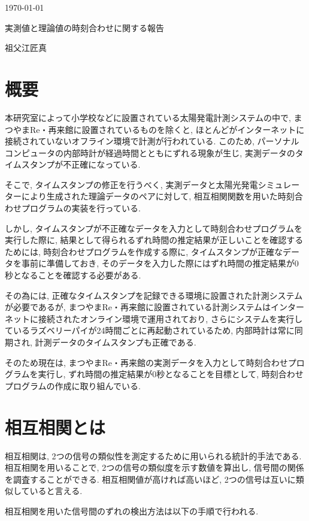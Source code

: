 \documentclass[a4j,12pt,]{jarticle}
\begin{document}
{\noindent\small  \hfill\today}
\begin{center}
  {\Large 実測値と理論値の時刻合わせに関する報告}
\end{center}
\begin{flushright}
  祖父江匠真 \\
\end{flushright}

\section{概要}
本研究室によって小学校などに設置されている太陽発電計測システムの中で, まつやまRe・再来館に設置されているものを除くと, ほとんどがインターネットに接続されていないオフライン環境で計測が行われている. このため, パーソナルコンピュータの内部時計が経過時間とともにずれる現象が生じ, 実測データのタイムスタンプが不正確になっている. 

そこで, タイムスタンプの修正を行うべく, 実測データと太陽光発電シミュレーターにより生成された理論データのペアに対して, 相互相関関数を用いた時刻合わせプログラムの実装を行っている. 

しかし, タイムスタンプが不正確なデータを入力として時刻合わせプログラムを実行した際に, 結果として得られるずれ時間の推定結果が正しいことを確認するためには, 時刻合わせプログラムを作成する際に, タイムスタンプが正確なデータを事前に準備しておき, そのデータを入力した際にはずれ時間の推定結果が0秒となることを確認する必要がある. 

その為には, 正確なタイムスタンプを記録できる環境に設置された計測システムが必要であるが, まつやまRe・再来館に設置されている計測システムはインターネットに接続されたオンライン環境で運用されており, さらにシステムを実行しているラズベリーパイが24時間ごとに再起動されているため, 内部時計は常に同期され, 計測データのタイムスタンプも正確である. 

そのため現在は, まつやまRe・再来館の実測データを入力として時刻合わせプログラムを実行し, ずれ時間の推定結果が0秒となることを目標として, 時刻合わせプログラムの作成に取り組んでいる. 

\section{相互相関とは}
相互相関は, 2つの信号の類似性を測定するために用いられる統計的手法である. 相互相関を用いることで, 2つの信号の類似度を示す数値を算出し, 信号間の関係を調査することができる. 相互相関値が高ければ高いほど, 2つの信号は互いに類似していると言える. 

相互相関を用いた信号間のずれの検出方法は以下の手順で行われる. 
\end{document}
